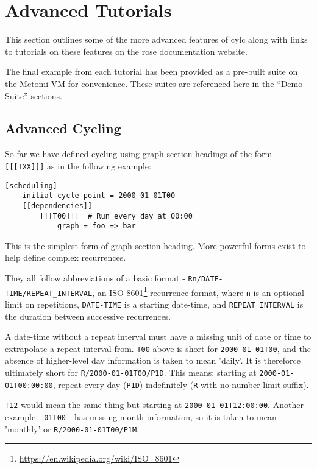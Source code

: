 \section{Advanced Tutorials}

This section outlines some of the more advanced features of cylc along with
links to tutorials on these features on the rose documentation website.

The final example from each tutorial has been provided as a pre-built suite on
the Metomi VM for convenience. These suites are referenced here in the ``Demo
Suite'' sections.


\subsection{Advanced Cycling}
\label{advanced-cycling}

So far we have defined cycling using graph section headings of the form
\lstinline{[[[TXX]]]} as in the following example:

\begin{lstlisting}
[scheduling]
    initial cycle point = 2000-01-01T00
    [[dependencies]]
        [[[T00]]]  # Run every day at 00:00
            graph = foo => bar
\end{lstlisting}

This is the simplest form of graph section heading. More powerful forms exist
to help define complex recurrences.

They all follow abbreviations of a basic format - \lstinline{Rn/DATE-TIME/REPEAT_INTERVAL}, an ISO 8601\footnote{\url{https://en.wikipedia.org/wiki/ISO_8601}} recurrence format, where \lstinline{n} is an optional limit on repetitions, \lstinline{DATE-TIME} is a starting date-time, and \lstinline{REPEAT_INTERVAL} is the duration between successive recurrences.

A date-time without a repeat interval must have a missing unit of date or time to extrapolate a repeat interval from. \lstinline{T00} above is short for \lstinline{2000-01-01T00}, and the absence of higher-level day information is taken to mean 'daily'. It is thereforce ultimately short for \lstinline{R/2000-01-01T00/P1D}. This means: starting at \lstinline{2000-01-01T00:00:00}, repeat every day (\lstinline{P1D}) indefinitely (\lstinline{R} with no number limit suffix).

\lstinline{T12} would mean the same thing but starting at \lstinline{2000-01-01T12:00:00}. Another example - \lstinline{01T00} - has missing month information, so it is taken to mean 'monthly' or \lstinline{R/2000-01-01T00/P1M}.

